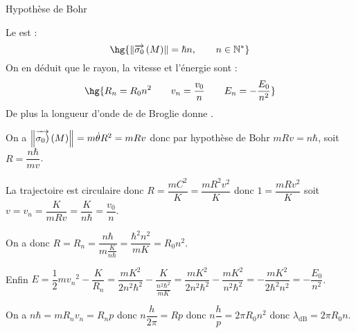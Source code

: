\documentclass[a4paper,french,bookmarks]{article}
\begin{document}
\begin{property}{Hypothèse de Bohr}{}{}
    \begin{minipage}{0.40\linewidth}
        \begin{center}
        \end{center}
    \end{minipage}
    \hfill
    \begin{minipage}{0.60\linewidth}
        Le  est  :
        \[\hg{\norm{\vec{\sigma_0}\left(M\right)} = \hbar n,\qquad n \in \bdN^*} \]
        On en déduit que le rayon, la vitesse et l'énergie sont  :
        \[ \hg{R_n = R_0n^2 \qquad v_n = \dfrac{v_0}{n} \qquad E_n = -\dfrac{E_0}{n^2}}\]
        De plus la longueur d'onde de de Broglie donne .
    \end{minipage}
\end{property}

\begin{nproof}
    On a $\left\Vert\overrightarrow{\sigma_0)}\left(M\right)\right\Vert = m\dot \theta R^2 = mR v$ donc par hypothèse de Bohr $mRv = n\hbar$, soit $R = \dfrac{n\hbar}{mv}$.

    \begin{enumerate}
        \itt La trajectoire est circulaire donc $R = \dfrac{mC^2}{K} = \dfrac{mR^2v^2}{K}$ donc $1 = \dfrac{mRv^2}{K}$ soit $v = v_n = \dfrac{K}{mRv} = \dfrac{K}{n\hbar} = \dfrac{v_0}{n}$.
        
        \itt On a donc $R = R_n = \dfrac{n\hbar}{m\frac{K}{n\hbar}} = \dfrac{\hbar^2n^2}{mK} = R_0n^2$. 
        
        \itt Enfin $E = \dfrac{1}{2}m{v_n}^2 - \dfrac{K}{R_n} = \dfrac{mK^2}{2n^2\hbar^2} - \dfrac{K}{\frac{n^2\hbar^2}{mK}} = \dfrac{mK^2}{2n^2\hbar^2} - \dfrac{mK^2}{n^2\hbar^2} = -\dfrac{mK^2}{2\hbar^2n^2} = -\dfrac{E_0}{n^2}$.
    \end{enumerate}
    
    On a $n\hbar = mR_nv_n = R_np$ donc $n\dfrac{h}{2\pi} = Rp$ donc $n \dfrac{h}{p} = 2\pi R_0n^2$ donc $\lambda_\text{dB} = 2\pi R_0 n$.
\end{nproof}
\end{document}
